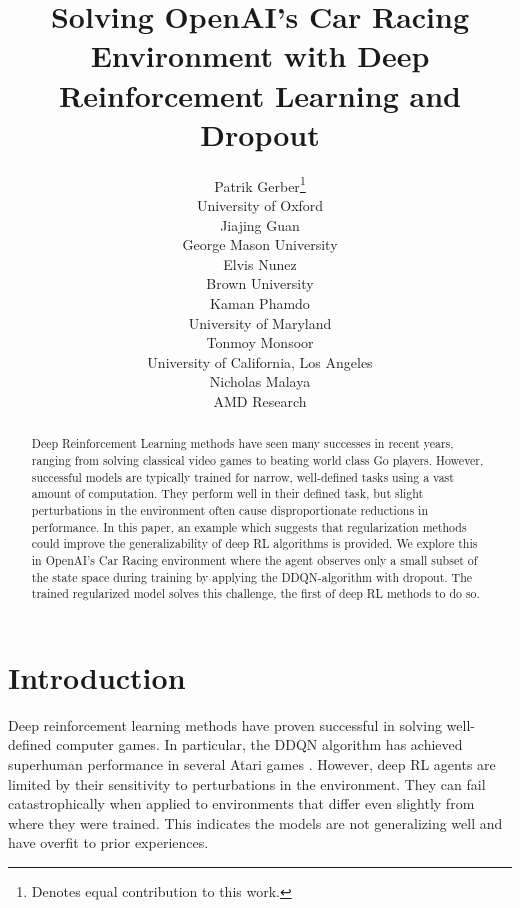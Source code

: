 \documentclass{article}
\title{Solving OpenAI's Car Racing Environment with Deep Reinforcement Learning and Dropout}
\author{
  Patrik Gerber\thanks{Denotes equal contribution to this work.}\\
  University of Oxford \\
  \And
  Jiajing Guan\samethanks \\
  George Mason University \\ 
  \And
  Elvis Nunez\samethanks \\
  Brown University \\
  \And
  Kaman Phamdo\samethanks \\
  University of Maryland \\
  \And
  Tonmoy Monsoor \\
  University of California, Los Angeles \\
  \And
  Nicholas Malaya \\ %
  AMD Research \\ 
}
\begin{document}

\maketitle

\begin{abstract}

  


  
Deep Reinforcement Learning methods have seen many successes in recent
years, ranging from solving classical video games to beating world
class Go players. However, successful models are typically trained for
narrow, well-defined tasks using a vast amount of computation. They
perform well in their defined task, but slight perturbations in the
environment often cause disproportionate reductions in performance. In
this paper, an example which suggests that regularization
methods could improve the generalizability of deep RL algorithms is
provided.
We explore this in OpenAI’s Car Racing environment where the agent
observes only a small subset of the state space during training by
applying the DDQN-algorithm with dropout.  The trained regularized
model solves this challenge, the first of deep RL methods to do so.
\end{abstract}

\vspace{-4mm}
\section{Introduction}
Deep reinforcement learning methods have proven successful in solving
well-defined computer games. In particular, the DDQN algorithm has
achieved superhuman performance in several Atari games
\cite{DQN}. However, deep RL agents are limited by their sensitivity
to perturbations in the environment. They can fail catastrophically
when applied to environments that differ even slightly from where they
were trained. This indicates the models
are not generalizing well and have overfit to prior experiences. 
\end{document}

